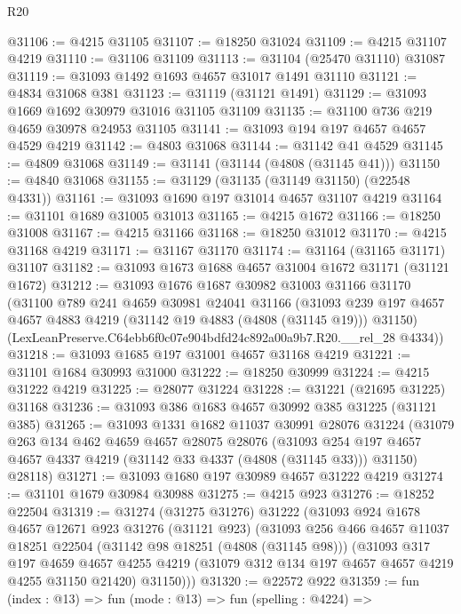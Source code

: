 \begin{lexlean}{R20}
\begin{coremodule}
@31106 := @4215 @31105
@31107 := @18250 @31024
@31109 := @4215 @31107 @4219
@31110 := @31106 @31109
@31113 := @31104 (@25470 @31110) @31087
@31119 := @31093 @1492 @1693 @4657 @31017 @1491 @31110
@31121 := @4834 @31068 @381
@31123 := @31119 (@31121 @1491)
@31129 := @31093 @1669 @1692 @30979 @31016 @31105 @31109
@31135 := @31100 @736 @219 @4659 @30978 @24953 @31105
@31141 := @31093 @194 @197 @4657 @4657 @4529 @4219
@31142 := @4803 @31068
@31144 := @31142 @41 @4529
@31145 := @4809 @31068
@31149 := @31141 (@31144 (@4808 (@31145 @41)))
@31150 := @4840 @31068
@31155 := @31129 (@31135 (@31149 @31150) (@22548 @4331))
@31161 := @31093 @1690 @197 @31014 @4657 @31107 @4219
@31164 := @31101 @1689 @31005 @31013
@31165 := @4215 @1672
@31166 := @18250 @31008
@31167 := @4215 @31166
@31168 := @18250 @31012
@31170 := @4215 @31168 @4219
@31171 := @31167 @31170
@31174 := @31164 (@31165 @31171) @31107
@31182 := @31093 @1673 @1688 @4657 @31004 @1672 @31171 (@31121 @1672)
@31212 := @31093
    @1676
    @1687
    @30982
    @31003
    @31166
    @31170
    (@31100
      @789
      @241
      @4659
      @30981
      @24041
      @31166
      (@31093 @239 @197 @4657 @4657 @4883 @4219 (@31142 @19 @4883 (@4808 (@31145 @19))) @31150)
      (LexLeanPreserve.C64ebb6f0c07e904bdfd24c892a00a9b7.R20.__rel_28 @4334))
@31218 := @31093 @1685 @197 @31001 @4657 @31168 @4219
@31221 := @31101 @1684 @30993 @31000
@31222 := @18250 @30999
@31224 := @4215 @31222 @4219
@31225 := @28077 @31224
@31228 := @31221 (@21695 @31225) @31168
@31236 := @31093 @386 @1683 @4657 @30992 @385 @31225 (@31121 @385)
@31265 := @31093
    @1331
    @1682
    @11037
    @30991
    @28076
    @31224
    (@31079
      @263
      @134
      @462
      @4659
      @4657
      @28075
      @28076
      (@31093 @254 @197 @4657 @4657 @4337 @4219 (@31142 @33 @4337 (@4808 (@31145 @33))) @31150)
      @28118)
@31271 := @31093 @1680 @197 @30989 @4657 @31222 @4219
@31274 := @31101 @1679 @30984 @30988
@31275 := @4215 @923
@31276 := @18252 @22504
@31319 := @31274
    (@31275 @31276)
    @31222
    (@31093
      @924
      @1678
      @4657
      @12671
      @923
      @31276
      (@31121 @923)
      (@31093
        @256
        @466
        @4657
        @11037
        @18251
        @22504
        (@31142 @98 @18251 (@4808 (@31145 @98)))
        (@31093
          @317
          @197
          @4659
          @4657
          @4255
          @4219
          (@31079 @312 @134 @197 @4657 @4657 @4219 @4255 @31150 @21420)
          @31150)))
@31320 := @22572 @922
@31359 := fun (index : @13) =>
  fun (mode : @13) =>
  fun (spelling : @4224) =>

\end{coremodule}
\end{lexlean}
